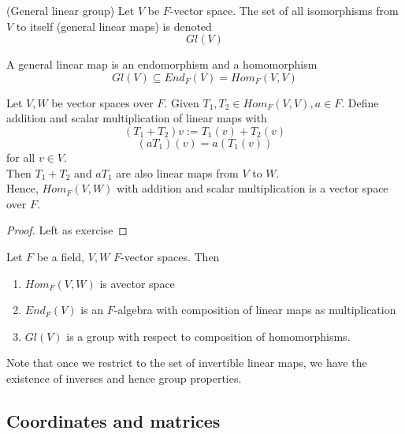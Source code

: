 \begin{definition}
    (General linear group) Let $V$ be $F$-vector space. The set of all isomorphisms from $V$ to itself (general linear maps) is denoted
    \[
        Gl(V)
    \]
\end{definition}

\begin{remark}
    A general linear map is an endomorphism and a homomorphism 
    \[
        Gl(V) \subseteq End_F(V) = Hom_F(V, V)
    \]
\end{remark}

\begin{theorem}
    Let $V, W$ be vector spaces over $F$. Given $T_1, T_2 \in Hom_F(V, V), a \in F$. Define addition and scalar multiplication of linear maps with 
    \[
        (T_1 + T_2) v := T_1 (v) + T_2 (v)
    \]
    \[
        (aT_1)(v) = a(T_1(v))
    \]
    for all $v \in V$. \\

    Then $T_1 + T_2$ and $aT_1$ are also linear maps from $V$ to $W$. \\

    Hence, $Hom_F(V, W)$ with addition and scalar multiplication is a vector space over $F$. \\
\end{theorem}

\begin{proof}
    Left as exercise
\end{proof}

\begin{remark}
    Let $F$ be a field, $V, W$ $F$-vector spaces. Then 
    \begin{enumerate}
        \item $Hom_F(V, W)$ is avector space 
        \item $End_F(V)$ is an $F$-algebra with composition of linear maps as multiplication 
        \item $Gl(V)$  is a group with respect to composition of homomorphisms. 
    \end{enumerate}

    Note that once we restrict to the set of invertible linear maps, we have the existence of inverses and hence group properties.
\end{remark}

\subsection{Coordinates and matrices} 

